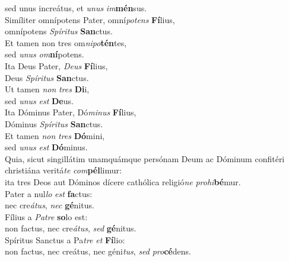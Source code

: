 \evenverse sed unus increátus, et \textit{u}\textit{nus} \textit{im}\textbf{mén}sus.\\
\oddverse Simíliter omnípotens Pater, omní\textit{po}\textit{tens} \textbf{Fí}lius,~\*\\
\oddverse omnípotens \textit{Spí}\textit{ri}\textit{tus} \textbf{San}ctus.\\
\evenverse Et tamen non tres om\textit{ni}\textit{po}\textbf{tén}tes,~\*\\
\evenverse sed \textit{u}\textit{nus} \textit{om}\textbf{ní}potens.\\
\oddverse Ita Deus Pater, \textit{De}\textit{us} \textbf{Fí}lius,~\*\\
\oddverse Deus \textit{Spí}\textit{ri}\textit{tus} \textbf{San}ctus.\\
\evenverse Ut tamen \textit{non} \textit{tres} \textbf{Di}i,~\*\\
\evenverse sed \textit{u}\textit{nus} \textit{est} \textbf{De}us.\\
\oddverse Ita Dóminus Pater, Dó\textit{mi}\textit{nus} \textbf{Fí}lius,~\*\\
\oddverse Dóminus \textit{Spí}\textit{ri}\textit{tus} \textbf{San}ctus.\\
\evenverse Et tamen \textit{non} \textit{tres} \textbf{Dó}mini,~\*\\
\evenverse sed \textit{u}\textit{nus} \textit{est} \textbf{Dó}minus.\\
\oddverse Quia, sicut singillátim unamquámque persónam Deum ac Dóminum confitéri christiána veritá\textit{te} \textit{com}\textbf{pél}limur:~\*\\
\oddverse ita tres Deos aut Dóminos dícere cathólica religió\textit{ne} \textit{pro}\textit{hi}\textbf{bé}mur.\\
\evenverse Pater a nul\textit{lo} \textit{est} \textbf{fa}ctus:~\*\\
\evenverse nec cre\textit{á}\textit{tus}, \textit{nec} \textbf{gé}nitus.\\
\oddverse Fílius a \textit{Pa}\textit{tre} \textbf{so}lo est:~\*\\
\oddverse non factus, nec cre\textit{á}\textit{tus}, \textit{sed} \textbf{gé}nitus.\\
\evenverse Spíritus Sanctus a Pa\textit{tre} \textit{et} \textbf{Fí}lio:~\*\\
\evenverse non factus, nec creátus, nec géni\textit{tus}, \textit{sed} \textit{pro}\textbf{cé}dens.\\
